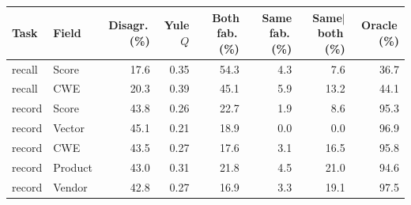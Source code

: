 \begin{tabular}{llrrrrrr}
\toprule
Task & Field & Disagr.\,(\%) & Yule $Q$ & Both fab.\,(\%) & Same fab.\,(\%) & Same$\mid$both\,(\%) & Oracle\,(\%) \\
\midrule
recall & Score & 17.6 & 0.35 & 54.3 & 4.3 & 7.6 & 36.7 \\
recall & CWE & 20.3 & 0.39 & 45.1 & 5.9 & 13.2 & 44.1 \\
record & Score & 43.8 & 0.26 & 22.7 & 1.9 & 8.6 & 95.3 \\
record & Vector & 45.1 & 0.21 & 18.9 & 0.0 & 0.0 & 96.9 \\
record & CWE & 43.5 & 0.27 & 17.6 & 3.1 & 16.5 & 95.8 \\
record & Product & 43.0 & 0.31 & 21.8 & 4.5 & 21.0 & 94.6 \\
record & Vendor & 42.8 & 0.27 & 16.9 & 3.3 & 19.1 & 97.5 \\
\bottomrule
\end{tabular}

